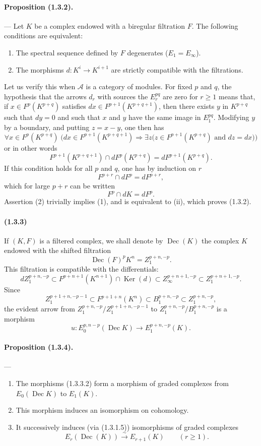 \documentclass[10pt]{article}
\newcommand{\Ker}{\operatorname{Ker}}
\newcommand{\calA}{\mathcal A}
\newcommand{\iso}{\xrightarrow{\sim}}
\newcommand{\Dec}{\operatorname{Dec}}
\begin{document}
\paragraph{Proposition (1.3.2).} --- Let $K$ be a complex endowed with a biregular filtration $F$. The following conditions are equivalent:
\begin{enumerate}[label=(\roman*)]
\item The spectral sequence defined by $F$ degenerates ($E_1=E_\infty$).
\item The morphisms $d:K^i\to K^{i+1}$ are strictly compatible with the filtrations.
\end{enumerate}
Let us verify this when $\calA$ is a category of modules. For fixed $p$ and $q$, the hypothesis that the arrows $d_r$ with sources the $E_r^{pq}$ are zero for $r\geq 1$ means that, if $x\in F^p(K^{p+q})$ satisfies $dx\in F^{p+1}(K^{p+q+1})$, then there exists $y$ in $K^{p+q}$ such that $dy=0$ and such that $x$ and $y$ have the same image in $E_1^{pq}$. Modifying $y$ by a boundary, and putting $z=x-y$, one then has
\[
\forall x\in F^p(K^{p+q})\;\bigl(dx\in F^{p+1}(K^{p+q+1})\Rightarrow
\exists z\bigl(z\in F^{p+1}(K^{p+q})\text{ and }dz=dx\bigr)\bigr)
\]
or in other words
\[
\tag{1}
F^{p+1}(K^{p+q+1})\cap dF^p(K^{p+q})=dF^{p+1}(K^{p+q}).
\]
If this condition holds for all $p$ and $q$, one has by induction on $r$
\[
F^{p+r}\cap dF^p=dF^{p+r},
\]
which for large $p+r$ can be written
\[
\tag{2}
F^p\cap dK=dF^p.
\]
Assertion (2) trivially implies (1), and is equivalent to (ii), which proves (1.3.2).

\paragraph{(1.3.3)} If $(K,F)$ is a filtered complex, we shall denote by $\Dec(K)$ the complex $K$ endowed with the shifted filtration
\[
\Dec(F)^pK^n=Z_1^{p+n,-p}.
\]
This filtration is compatible with the differentials:
\[
dZ_1^{p+n,-p}\subset F^{p+n+1}(K^{n+1})\cap\Ker(d)
       \subset Z_\infty^{p+n+1,-p}\subset Z_1^{p+n+1,-p}.
\]
Since
\[
\tag{1.3.3.1}
Z_1^{p+1+n,-p-1}\subset F^{p+1+n}(K^n)\subset B_1^{p+n,-p}\subset Z_1^{p+n,-p},
\]
the evident arrow from $Z_1^{p+n,-p}/Z_1^{p+1+n,-p-1}$ to $Z_1^{p+n,-p}/B_1^{p+n,-p}$ is a morphism
\[
\tag{1.3.3.2}
u:E_0^{p,n-p}(\Dec K)\longrightarrow E_1^{p+n,-p}(K).
\]

\paragraph{Proposition (1.3.4).} ---
\begin{enumerate}[label=(\roman*)]
\item The morphisms (1.3.3.2) form a morphism of graded complexes from $E_0(\Dec K)$ to $E_1(K)$.
\item This morphism induces an isomorphism on cohomology.
\item It successively induces (via (1.3.1.5)) isomorphisms of graded complexes
\[
E_r(\Dec(K))\iso E_{r+1}(K)\qquad(r\ge1).
\]
\end{enumerate}
\end{document}
